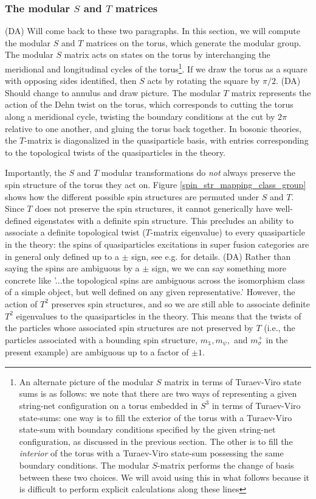 \documentclass[12pt,a4paper]{article}
\newcommand{\unit}{\mathds{1}}
\newcommand{\dave}[1]{{\color{ao(english)}\footnotesize{(DA) #1}}}
\begin{document}
\subsubsection{The modular $S$ and $T$ matrices}
\dave{Will come back to these two paragraphs.}
In this section, we will compute the modular $S$ and $T$ matrices on the torus, which generate the modular group. 
The modular $S$ matrix acts on states on the torus by interchanging the meridional and longitudinal cycles 
of the torus\footnote{An alternate picture of the modular $S$ matrix in terms of Turaev-Viro state sums 
is as follows: we note that there are two ways of representing a given string-net configuration on a torus embedded 
in $S^3$ in terms of Turaev-Viro state-sums: one way is to fill the exterior of the torus with a 
Turaev-Viro state-sum with boundary conditions specified by the given string-net configuration, as discussed in the previous section. 
The other is to fill the {\it interior} of the torus with a Turaev-Viro state-sum possessing the same boundary conditions. 
The modular $S$-matrix performs the change of basis between these two choices.
We will avoid using this in what follows because it is difficult to perform explicit calculations along these lines}. 
If we draw the torus as a square with opposing sides identified, then $S$ acts by rotating the square by $\pi/2$.
\dave{Should change to annulus and draw picture.} 
The modular $T$ matrix represents the action of the Dehn twist on the torus, 
which corresponds to cutting the torus along a meridional cycle, 
twisting the boundary conditions at the cut by $2\pi$ relative to one another, and gluing the torus back together.
In bosonic theories, the $T$-matrix is diagonalized in the quasiparticle basis, with 
entries corresponding to the topological twists of the quasiparticles in the theory. 

Importantly, the $S$ and $T$ modular transformations do {\it not} always preserve the spin structure of the torus they act on. 
Figure \ref{spin_str_mapping_class_group} shows how the different possible spin structures are permuted under $S$ and $T$. 
Since $T$ does not preserve the spin structures, it cannot generically have well-defined eigenstates with a definite spin structure. 
This precludes an ability to associate a definite topological twist ($T$-matrix eigenvalue) to every quasiparticle 
in the theory: the spins of quasiparticles excitations in super fusion categories are in general only defined 
up to a $\pm$ sign, see e.g. \cite{cano2014,bruillard2017,gu2014} for details.
\dave{Rather than saying the spins are ambiguous by a $\pm$ sign, we we can say something more 
concrete like '...the topological spins are ambiguous across the isomorphism class of a simple object, 
but well defined on any given representative.'}
However, the action of $T^2$ preserves spin structures, and so we are still able to associate definite $T^2$ 
eigenvalues to the quasiparticles in the theory.
This means that the twists of the particles whose associated spin structures are not preserved 
by $T$ (i.e., the particles associated with a bounding spin structure, $m_\unit,m_\psi,$ and $m_\sigma^+$ in 
the present example) are ambiguous up to a factor of $\pm1$.  
\end{document}
